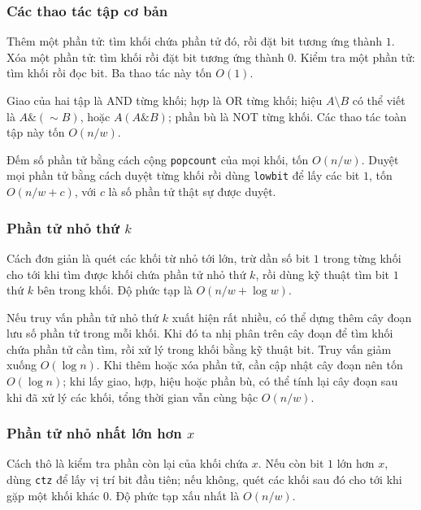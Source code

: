 \documentclass[11pt]{article}
\begin{document}
\subsubsection{Các thao tác tập cơ bản}

Thêm một phần tử: tìm khối chứa phần tử đó, rồi đặt bit tương ứng thành \(1\).
Xóa một phần tử: tìm khối rồi đặt bit tương ứng thành \(0\). Kiểm tra một phần
tử: tìm khối rồi đọc bit. Ba thao tác này tốn \(O(1)\).

Giao của hai tập là AND từng khối; hợp là OR từng khối; hiệu \(A\setminus B\)
có thể viết là \(A\&( \sim B)\), hoặc \(A\mathbin{\hat{}}(A\&B)\); phần bù là
NOT từng khối. Các thao tác toàn tập này tốn \(O(n/w)\).

Đếm số phần tử bằng cách cộng \texttt{popcount} của mọi khối, tốn \(O(n/w)\).
Duyệt mọi phần tử bằng cách duyệt từng khối rồi dùng \texttt{lowbit} để lấy
các bit \(1\), tốn \(O(n/w+c)\), với \(c\) là số phần tử thật sự được duyệt.

\subsubsection{\texorpdfstring{Phần tử nhỏ thứ \(k\)}{Phần tử nhỏ thứ k}}

Cách đơn giản là quét các khối từ nhỏ tới lớn, trừ dần số bit \(1\) trong từng
khối cho tới khi tìm được khối chứa phần tử nhỏ thứ \(k\), rồi dùng kỹ thuật
tìm bit \(1\) thứ \(k\) bên trong khối. Độ phức tạp là \(O(n/w+\log w)\).

Nếu truy vấn phần tử nhỏ thứ \(k\) xuất hiện rất nhiều, có thể dựng thêm cây
đoạn lưu số phần tử trong mỗi khối. Khi đó ta nhị phân trên cây đoạn để tìm
khối chứa phần tử cần tìm, rồi xử lý trong khối bằng kỹ thuật bit. Truy vấn
giảm xuống \(O(\log n)\). Khi thêm hoặc xóa phần tử, cần cập nhật cây đoạn nên
tốn \(O(\log n)\); khi lấy giao, hợp, hiệu hoặc phần bù, có thể tính lại cây
đoạn sau khi đã xử lý các khối, tổng thời gian vẫn cùng bậc \(O(n/w)\).

\subsubsection{\texorpdfstring{Phần tử nhỏ nhất lớn hơn \(x\)}{Phần tử nhỏ nhất lớn hơn x}}

Cách thô là kiểm tra phần còn lại của khối chứa \(x\). Nếu còn bit \(1\) lớn
hơn \(x\), dùng \texttt{ctz} để lấy vị trí bit đầu tiên; nếu không, quét các
khối sau đó cho tới khi gặp một khối khác \(0\). Độ phức tạp xấu nhất là
\(O(n/w)\).
\end{document}

